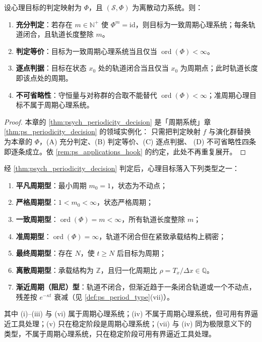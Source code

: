 \begin{theorem}[心理周期性判定定理]\label{thm:psych_periodicity_decision}
设心理目标的判定映射为 $\Phi$，且 $(\mathcal S,\Phi)$ 为离散动力系统。则：
\begin{enumerate}[label=(\Alph*)]
    \item \textbf{充分判定}：若存在 $m\in\mathbb N^+$ 使 $\Phi^m=\mathrm{id}$，则目标为一致周期心理系统；每条轨道闭合，且轨道长度整除 $m$。
    \item \textbf{判定等价}：目标为一致周期心理系统当且仅当 $\operatorname{ord}(\Phi)<\infty$。
    \item \textbf{逐点判据}：目标在状态 $x_0$ 处的轨道闭合当且仅当 $x_0$ 为周期点；此时轨道长度即该点处的周期。
    \item \textbf{不可省略性}：守恒量与对称群的合取不能替代 $\operatorname{ord}(\Phi)<\infty$；准周期心理目标不属于周期心理系统。
\end{enumerate}
\end{theorem}

\begin{proof}
本章的 \cref{thm:psych_periodicity_decision} 是「周期系统」章 \cref{thm:ps_periodicity_decision} 的领域实例化：
只需把判定映射 $f$ 与演化群替换为本章的 $\Phi$，(A) 充分判定、(B) 判定等价、(C) 逐点判据、
(D) 不可省略性四条即逐条成立。依 \cref{rem:ps_applications_hook} 的约定，此处不再重复展开。
\end{proof}

\begin{corollary}[心理周期类型]\label{cor:psych_period_type}
经 \cref{thm:psych_periodicity_decision} 判定后，心理目标落入下列类型之一：
\begin{enumerate}[label=(\roman*)]
    \item \textbf{平凡周期型}：最小周期 $m_0=1$，状态为不动点；
    \item \textbf{严格周期型}：$1<m_0<\infty$，状态严格周期；
    \item \textbf{一致周期型}：$\operatorname{ord}(\Phi)=m<\infty$，所有轨道长度整除 $m$；
    \item \textbf{准周期型}：$\operatorname{ord}(\Phi)=\infty$，轨道不闭合但在紧致承载结构上稠密；
    \item \textbf{最终周期型}：存在 $N$，使 $t\ge N$ 后目标为周期；
    \item \textbf{离散周期型}：承载结构为 $\mathbb Z$，且归一化周期比 $\rho=T_x/\Delta x\in\mathbb Q$。
    \item \textbf{渐近周期（阻尼）型}：轨道不闭合，但渐近趋于一条闭合轨道或一个不动点，残差按 $e^{-\kappa t}$ 衰减（见 \cref{def:ps_period_type}(vii)）。
\end{enumerate}
其中 (i)--(iii) 与 (vi) 属于周期心理系统；(iv) 不属于周期心理系统，但可用有界逼近工具处理；(v) 只在稳定阶段是周期心理系统；(vii) 与 (iv) 同为极限意义下的类型，不属于周期心理系统，只在稳定阶段可用有界逼近工具处理。
\end{corollary}

